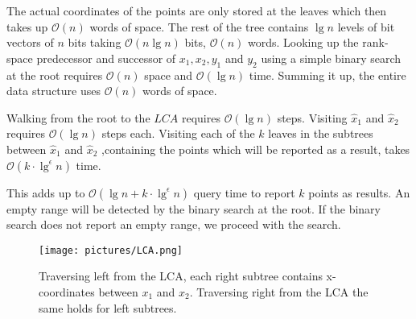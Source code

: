 
The actual coordinates of the points are only stored at the leaves which then takes up $\mathcal{O}(n)$  words of space. The rest of the tree contains $\lg n$ levels of bit vectors of $n$ bits taking $\mathcal{O}(n \lg n)$ bits, $\mathcal{O}(n)$ words. Looking up the rank-space predecessor and successor of $x_1, x_2, y_1$ and $y_2$ using a simple binary search at the root requires $\mathcal{O}(n)$ space and $\mathcal{O}(\lg n)$ time. Summing it up, the entire data structure uses $\mathcal{O}(n)$ words of space. 

Walking from the root to the $LCA$ requires $\mathcal{O}(\lg n)$ steps. Visiting $\hat{x}_1$ and $\hat{x}_2$ requires $\mathcal{O}(\lg n)$ steps each. Visiting each of the $k$ leaves in the subtrees between $\hat{x}_1$ and $\hat{x}_2$ ,containing the points which will be reported as a result, takes $\mathcal{O}(k \cdot \lg^\epsilon n)$ time.

This adds up to $\mathcal{O}(\lg n + k\cdot\lg^\epsilon n)$ query time to report $k$ points as results. An empty range will be detected by the binary search at the root. If the binary search does not report an empty range, we proceed with the search. 

\begin{figure}[H]
    \centering
    \texttt{[image: pictures/LCA.png]}
    \caption{Traversing left from the LCA, each right subtree contains x-coordinates between $x_1$ and $x_2$. Traversing right from the LCA the same holds for left subtrees.}
    \label{fig:LCA}
\end{figure}



